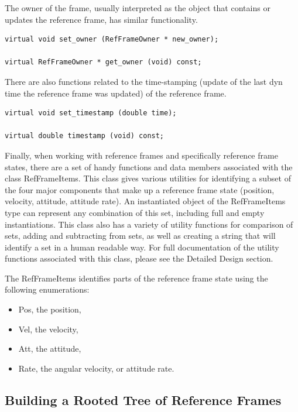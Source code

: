The owner of the frame, usually interpreted as the object that
contains or updates the reference frame, has similar functionality.

\begin{verbatim}
virtual void set_owner (RefFrameOwner * new_owner);

virtual RefFrameOwner * get_owner (void) const;
\end{verbatim}

There are also functions related to the time-stamping (update of the last
dyn time \cite{dynenv:TIME} the reference frame was updated)
of the reference frame.

\begin{verbatim}
virtual void set_timestamp (double time);

virtual double timestamp (void) const;
\end{verbatim}

Finally, when working with reference frames and specifically reference frame
states, there are a set of handy functions and data members associated with
the class RefFrameItems. This class gives various utilities for identifying
a subset of the four major components that make up a reference frame state
(position, velocity, attitude, attitude rate). An instantiated object of
the RefFrameItems type can represent any combination of this set, including
full and empty instantiations. This class also has a variety of utility
functions for comparison of sets, adding and subtracting from sets, as well
as creating a string that will identify a set in a human readable way. For
full documentation of the utility functions associated with this class,
please see the Detailed Design section.

The RefFrameItems identifies parts of the reference frame state using
the following enumerations:

\begin{itemize}
\item{Pos}, the position,
\item{Vel}, the velocity,
\item{Att}, the attitude,
\item{Rate}, the angular velocity, or attitude rate.
\end{itemize}

\subsection{Building a Rooted Tree of Reference Frames}

